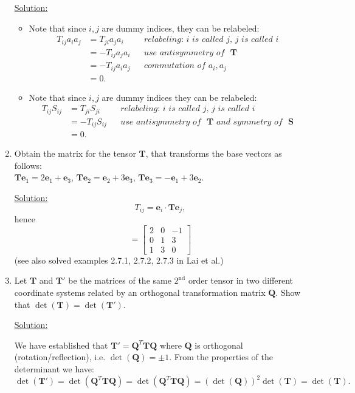 \documentclass{article}
\newcommand{\ee}{\end{equation}}
\newcommand{\be}{\begin{equation}}
\newcommand{\bi}{\begin{itemize}}
\newcommand{\ei}{\end{itemize}}
\newcommand{\bs}{\boldsymbol}
\begin{document}
\begin{enumerate}
\underline{Solution:}
\bi
\item Note that since $i,j$ are dummy indices, they can be relabeled:
\begin{align}
T_{ij} a_i a_j &= T_{ji} a_j a_i && \textit{relabeling: $i$ is called $j$, $j$ is called $i$} \\ \nonumber
&= -T_{ij}a_ja_i && \textit{use antisymmetry of ~$\bs T$} \\ \nonumber
&=-T_{ij}a_ia_j && \textit{commutation of $a_i,a_j$} \\ \nonumber
& = 0.
\end{align}
\item  Note that since $i,j$ are dummy indices they can be relabeled:
\begin{align}
 T_{ij} S_{ij} &= T_{ji}S_{ji} && \textit{relabeling: $i$ is called $j$, $j$ is called $i$} \\ \nonumber
 &=-T_{ij} S_{ij} && \textit{use antisymmetry of ~$\bs T$ and symmetry of ~$\bs S$} \\ \nonumber
 &= 0.
\end{align}
\ei


\item Obtain the matrix for the tensor $\bs{T}$, that transforms the base vectors as follows: \\
$\bs{T}\bs{e}_1=2\bs{e}_1+\bs{e}_3$, $\bs{T}\bs{e}_2=\bs{e}_2+3\bs{e}_3$, $\bs{T}\bs{e}_3=-\bs{e}_1+3\bs{e}_2$.
%

\underline{Solution:}
\be
T_{ij} = \bs e_i \cdot \bs T \bs e_j,
\ee
hence
\be
[\bs{T}]=\left[ \begin{array}{lll} 2 & 0 & -1 \\ 0 & 1& 3 \\ 1 &3 & 0 \end{array} \right]
\ee
(see also solved examples 2.7.1, 2.7.2, 2.7.3 in Lai et al.)

\item  Let $\bs{T}$ and $\bs{T}'$ be the matrices of the same $2^{\textrm{nd}}$ order tensor in two different coordinate
systems related by an orthogonal transformation matrix $\bs Q$. Show that $\det(\bs{T}) = \det(\bs{T}')$.

\underline{Solution:}

We have established that $\bs{T}' = \bs{Q}^T \bs{T} \bs{Q}$ where $\bs{Q}$ is orthogonal (rotation/reflection),
i.e. $\det(\bs{Q}) = \pm 1$. From the properties of the determinant we have:
\be
\det (\bs{T}') = \det(\bs{Q}^T \bs{T}\bs{Q}) = \det(\bs Q^T \bs T \bs Q) = (\det(\bs{Q}))^2 \det(\bs{T}) = \det(\bs{T}).
\ee


\end{enumerate}
\end{document}
